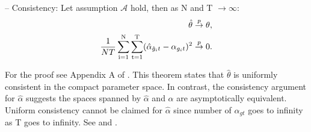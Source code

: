 \begin{theorem}\label{eqn:gfeconsist} -- Consistency: Let assumption $\mathcal{A}$ hold, then as N and T $\rightarrow \infty$:
\begin{align*}
    \hat\theta  \overset{p}{\to} \theta,\\
\dfrac{1}{NT} \operatorname*{\sum_{i=1}^N} \operatorname*{\sum_{t=1}^T} (\hat\alpha_{\hat g_{i}t} - \alpha_{g_{i}t})^2
    \overset{p}{\to} 0.
\end{align*}
\end{theorem}
For the proof see Appendix A of \textcite{bonhomme2015grouped}. This theorem states that $\hat\theta$ is uniformly consistent in the compact parameter space. In contrast, the consistency argument for $\hat{\alpha}$ suggests the spaces spanned by $\hat{\alpha}$ and $\alpha$ are asymptotically equivalent. Uniform consistency cannot be claimed for $\hat{\alpha}$ since number of $\alpha_{gt}$ goes to infinity as T goes to infinity. See \textcite{newey1994large} and \textcite{bai2009panel}.


